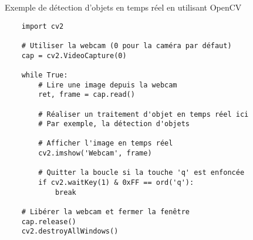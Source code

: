 \begin{frame}[fragile]{Exemple de détection d'objets en temps réel en utilisant OpenCV}
    \begin{verbatim}
    import cv2

    # Utiliser la webcam (0 pour la caméra par défaut)
    cap = cv2.VideoCapture(0)

    while True:
        # Lire une image depuis la webcam
        ret, frame = cap.read()

        # Réaliser un traitement d'objet en temps réel ici
        # Par exemple, la détection d'objets

        # Afficher l'image en temps réel
        cv2.imshow('Webcam', frame)

        # Quitter la boucle si la touche 'q' est enfoncée
        if cv2.waitKey(1) & 0xFF == ord('q'):
            break

    # Libérer la webcam et fermer la fenêtre
    cap.release()
    cv2.destroyAllWindows()
    \end{verbatim}
\end{frame}